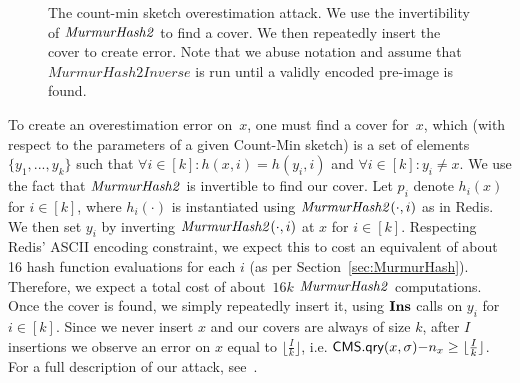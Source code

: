 \begin{figure}[h] 
    \centering
    \begin{pcvstack}
    \end{pcvstack}
    \caption[Redis CMS Overestimation Attack.]{The count-min sketch overestimation attack. We use the invertibility of $\mathit{MurmurHash2}$ to find a cover. We then repeatedly insert the cover to create error. Note that we abuse notation and assume that~$\mathit{MurmurHash2Inverse}$ is run until a validly encoded pre-image is found.} 
	\label{fig:cms-attack}
\end{figure}

To create an overestimation error on~$x$, one must find a cover for~$x$, which (with respect to the parameters of a given Count-Min sketch) is a set of elements~$\{ y_1{,}...{,}y_k\}$ such that ${\forall} i {\in} [k] {:} h(x,i) {=} h(y_i,i)$ and $\forall i {\in} [k] {:} y_i {\neq} x$. We use the fact that $\mathit{MurmurHash2}$ is invertible to find our cover. Let $p_i$ denote $h_i(x)$ for $i \in [k]$, where $h_i(\cdot)$ is instantiated using $\mathit{MurmurHash2}(\cdot,i)$ as in Redis. We then set $y_i$ by inverting $\mathit{MurmurHash2}(\cdot,i)$ at $x$ for $i \in [k]$. Respecting Redis' ASCII encoding constraint, we expect this to cost an equivalent of about 16 hash function evaluations for each $i$ (as per Section~\ref{sec:MurmurHash}). Therefore, we expect a total cost of about~$16 k$ $\mathit{MurmurHash2}$ computations. Once the cover is found, we simply repeatedly insert it, using $\textbf{Ins}$ calls on $y_i$ for $i \in [k]$. Since we never insert $x$ and our covers are always of size $k$, after $I$ insertions we observe an error on $x$ equal to $\lfloor \frac{I}{k}  \rfloor$, i.e. $\textsf{CMS}.\textsf{qry}(x, \sigma) {-} n_x \geq \lfloor \frac{I}{k} \rfloor$. For a full description of our attack, see~.

